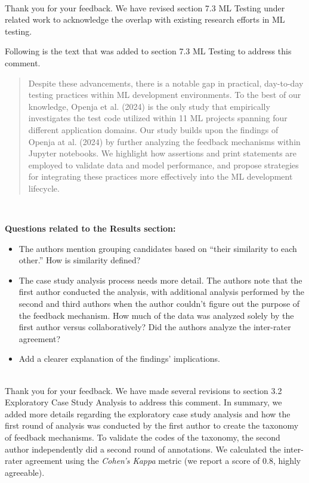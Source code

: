 \documentclass[11pt,fleqn]{article}
\newcommand{\eline}{\vspace*{.75\baselineskip}}
\newcommand{\Referee}[1]{\eline \noindent {\bf Reviewer comment #1:} \\}
\newcommand{\Us}{\eline \noindent {\bf Response:}\\}
\newenvironment{revcomment}[1][]
{\Referee{#1}\begin{rcomment}}
{\end{rcomment}}
\begin{document}
\Us Thank you for your feedback. We have revised section 7.3 ML Testing under related work to acknowledge the overlap with existing research efforts in ML testing.

Following is the text that was added to section 7.3 ML Testing to address this comment.

\begin{quote}
  Despite these advancements, there is a notable gap in practical, day-to-day testing practices within ML development environments. To the best of our knowledge, Openja et al. (2024) is the only study that empirically investigates the test code utilized within 11 ML projects spanning four different application domains. Our study builds upon the findings of Openja at al. (2024) by further analyzing the feedback mechanisms within Jupyter notebooks. We highlight how assertions and print statements are employed to validate data and model performance, and propose strategies for integrating these practices more effectively into the ML development lifecycle.
\end{quote}

\begin{revcomment}[3.10]
  \textbf{Questions related to the Results section:}

  \begin{itemize}
    \item The authors mention grouping candidates based on ``their similarity to each other.'' How is similarity defined?
    \item The case study analysis process needs more detail. The authors note that the first author conducted the analysis, with additional analysis performed by the second and third authors when the author couldn't figure out the purpose of the feedback mechanism. How much of the data was analyzed solely by the first author versus collaboratively? Did the authors analyze the inter-rater agreement?
    \item Add a clearer explanation of the findings' implications.
  \end{itemize}
\end{revcomment}

\Us Thank you for your feedback. We have made several revisions to section 3.2 Exploratory Case Study Analysis to address this comment. In summary, we added more details regarding the exploratory case study analysis and how the first round of analysis was conducted by the first author to create the taxonomy of feedback mechanisms. To validate the codes of the taxonomy, the second author independently did a second round of annotations. We calculated the inter-rater agreement using the \emph{Cohen's Kappa} metric (we report a score of 0.8, highly agreeable).
\end{document}
